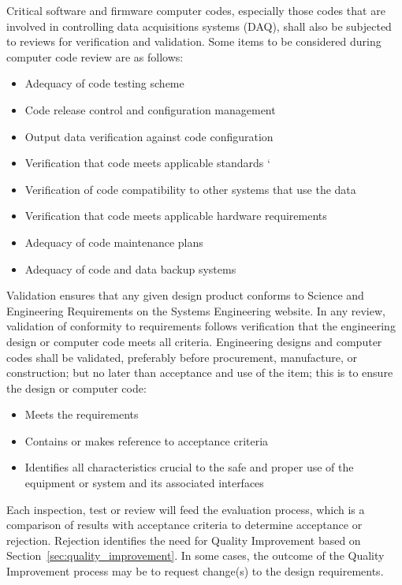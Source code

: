 Critical software and firmware computer codes, especially those codes
that are involved in controlling  data acquisitions
systems (DAQ), shall also be subjected to reviews for verification and
validation. Some items to be considered during computer code review
are as follows:
\begin{itemize}
\item Adequacy of code testing scheme
\item Code release control and configuration management
  \item Output data verification against code configuration
  \item Verification that code meets applicable standards `
  \item Verification of code compatibility to other systems that use
    the data
  \item Verification that code meets applicable hardware requirements
  \item Adequacy of code maintenance plans
  \item Adequacy of code and data backup systems
\end{itemize}

Validation ensures that any given design product conforms to 
Science and Engineering Requirements on the Systems Engineering
website. In any review, validation of conformity to requirements
follows verification that the engineering design or computer code
meets all criteria. Engineering designs and computer codes shall be
validated, preferably before procurement, manufacture, or
construction; but no later than acceptance and use of the item; this
is to ensure the design or computer code:
\begin{itemize}
 \item Meets the  requirements
 \item Contains or makes reference to acceptance criteria
 \item Identifies all characteristics crucial to the safe and proper
   use of the equipment or system and its associated interfaces
\end{itemize}

Each inspection, test or review will feed the  evaluation
process, which is a comparison of results with acceptance criteria to
determine acceptance or rejection. Rejection identifies the need for
Quality Improvement based on Section~\ref{sec:quality_improvement}. In
some cases, the outcome of the Quality Improvement process may be to
request change(s) to the design requirements.

